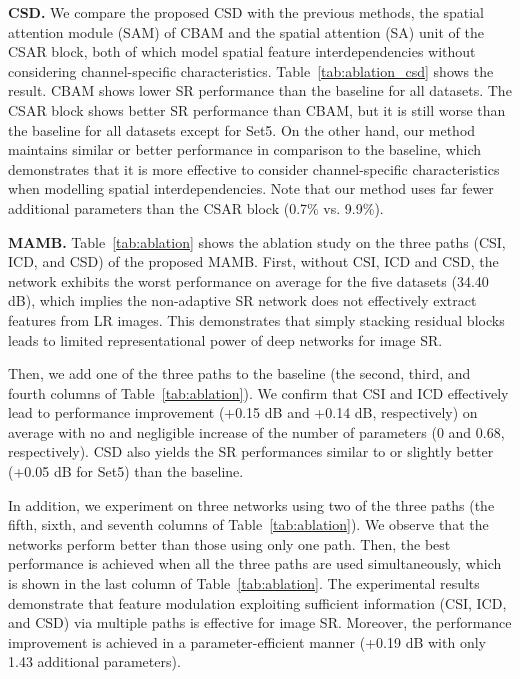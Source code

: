 \documentclass[final,5p,times,twocolumn]{elsarticle}
\begin{document}
\textbf{CSD.}
We compare the proposed CSD with the previous methods, the spatial attention module (SAM) of CBAM and the spatial attention (SA) unit of the CSAR block, both of which model spatial feature interdependencies without considering channel-specific characteristics.
Table~\ref{tab:ablation_csd} shows the result.
CBAM shows lower SR performance than the baseline for all datasets.
The CSAR block shows better SR performance than CBAM, but it is still worse than the baseline for all datasets except for Set5.
On the other hand, our method maintains similar or better performance in comparison to the baseline, which demonstrates that it is more effective to consider channel-specific characteristics when modelling spatial interdependencies.
Note that our method uses far fewer additional parameters than the CSAR block (0.7\% vs. 9.9\%).


\textbf{MAMB.}
Table~\ref{tab:ablation} shows the ablation study on the three paths (CSI, ICD, and CSD) of the proposed MAMB.
First, without CSI, ICD and CSD, the network exhibits the worst performance on average for the five datasets (34.40 dB), which implies the non-adaptive SR network does not effectively extract features from LR images.
This demonstrates that simply stacking residual blocks leads to limited representational power of deep networks for image SR.



Then, we add one of the three paths to the baseline (the second, third, and fourth columns of Table~\ref{tab:ablation}).
We confirm that CSI and ICD effectively lead to performance improvement (+0.15 dB and +0.14 dB, respectively) on average with no and negligible increase of the number of parameters (0 and 0.68, respectively).
CSD also yields the SR performances similar to or slightly better (+0.05 dB for Set5) than the baseline. 


In addition, we experiment on three networks using two of the three paths (the fifth, sixth, and seventh columns of Table~\ref{tab:ablation}).
We observe that the networks perform better than those using only one path.
Then, the best performance is achieved when all the three paths are used simultaneously, which is shown in the last column of Table~\ref{tab:ablation}.
The experimental results demonstrate that feature modulation exploiting sufficient information (CSI, ICD, and CSD) via multiple paths is effective for image SR.
Moreover, the performance improvement is achieved in a parameter-efficient manner (+0.19 dB with only 1.43 additional parameters).
\end{document}
